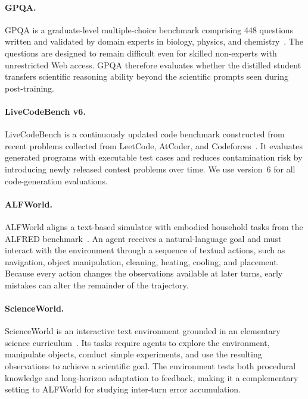 \paragraph{GPQA.}
GPQA is a graduate-level multiple-choice benchmark comprising 448 questions written and validated by domain experts in biology, physics, and chemistry~\citep{abs-2311-12022}. 
The questions are designed to remain difficult even for skilled non-experts with unrestricted Web access. 
GPQA therefore evaluates whether the distilled student transfers scientific reasoning ability beyond the scientific prompts seen during post-training.

\paragraph{LiveCodeBench v6.}
LiveCodeBench is a continuously updated code benchmark constructed from recent problems collected from LeetCode, AtCoder, and Codeforces~\citep{JainHGLYZWSSS25}. 
It evaluates generated programs with executable test cases and reduces contamination risk by introducing newly released contest problems over time. 
We use version~6 for all code-generation evaluations.

\paragraph{ALFWorld.}
ALFWorld aligns a text-based simulator with embodied household tasks from the ALFRED benchmark~\citep{ShridharYCBTH21}. 
An agent receives a natural-language goal and must interact with the environment through a sequence of textual actions, such as navigation, object manipulation, cleaning, heating, cooling, and placement.  Because every action changes the observations available at later turns, early mistakes can alter the remainder of the trajectory.

\paragraph{ScienceWorld.}
ScienceWorld is an interactive text environment grounded in an elementary science curriculum~\citep{WangJCA22}. 
Its tasks require agents to explore the environment, manipulate objects, conduct simple experiments, and use the resulting observations to achieve a scientific goal. 
The environment tests both procedural knowledge and long-horizon adaptation to feedback, making it a
complementary setting to ALFWorld for studying inter-turn error accumulation.

